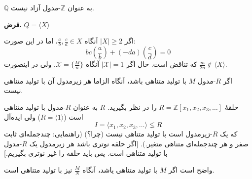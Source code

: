 \begin{frame}
    \begin{example}
        $\mathbb{Q}$ به عنوان $\mathbb{Z}$-مدول آزاد نیست.
    \end{example}


    \textbf{فرض.} $Q = \langle X \rangle$


    اگر $|X| \ge 2$ آنگاه $\frac{a}{b}, \frac{c}{d} \in X$، اما در این صورت:
    \[
        bc \left( \frac{a}{b} \right) + (-da) \left( \frac{c}{d} \right) = 0
    \]
    که تناقض است.
    حال اگر
    $|\mathcal{X}| = 1$
    آنگاه
    \(\mathcal{X} = \{\frac{M}{n}\}\).
    ولی در اینصورت
    \(\frac{m}{2n}\notin \langle X \rangle\).


\end{frame}


\begin{frame}
    \begin{remark}
        اگر $R$-مدول $M$ با تولید متناهی باشد، آنگاه الزاما هر زیرمدول آن با تولید متناهی نیست.
    \end{remark}

    \begin{example}
        حلقهٔ $R = \mathbb{Z}[x_1, x_2, x_3, \dots]$ را در نظر بگیرید. $R$ به عنوان $R$-مدول با تولید متناهی است ($R = \langle 1 \rangle$) ولی ایده‌آل
        \[
            I = \langle x_1, x_2, x_3, \dots \rangle \lneq R
        \]
        که یک $R$-زیرمدول است با تولید متناهی نیست (چرا؟) (راهنمایی: چندجمله‌ای ثابت صفر و هر چندجمله‌ای متناهی متغیر.).
            [اگر حلقه نوتری باشد هر زیرمدول یک $R$-مدول با تولید متناهی است. پس باید حلقه را غیر نوتری بگیریم.]
        \[
            \text{}
        \]
    \end{example}
    \begin{remark}
        واضح است اگر $M$ با تولید متناهی یاشد، آنگاه $\frac{M}{N}$ نیز با تولید متناهی است.
    \end{remark}

\end{frame}



